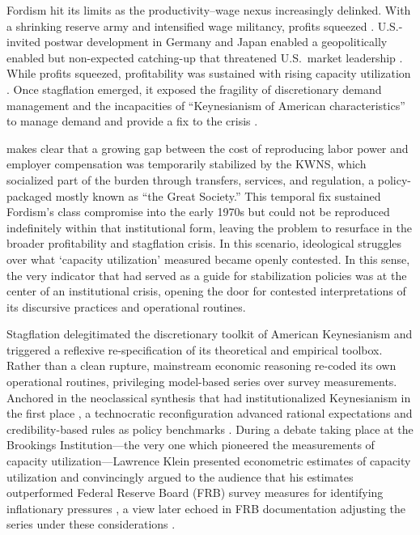 \documentclass[11pt]{article}
\begin{document}
Fordism hit its limits as the productivity--wage nexus increasingly delinked. With a shrinking reserve army and intensified wage militancy, profits squeezed \citep{weisskopf1979}. U.S.-invited postwar development in Germany and Japan enabled a geopolitically enabled but non-expected catching-up that threatened U.S.\ market leadership \citep{lipietz1987,vidal2019geriatric}. While profits squeezed, profitability was sustained with rising capacity utilization \citep{weisskopf1979,shaikh2016}. Once stagflation emerged, it exposed the fragility of discretionary demand management and the incapacities of ``Keynesianism of American characteristics'' to manage demand and provide a fix to the crisis \citep{shaikhetal1999}.

\citet{moos2021} makes clear that a growing gap between the cost of reproducing labor power and employer compensation was temporarily stabilized by the KWNS, which socialized part of the burden through transfers, services, and regulation, a policy-packaged mostly known as ``the Great Society.'' This temporal fix sustained Fordism's class compromise into the early 1970s but could not be reproduced indefinitely within that institutional form, leaving the problem to resurface in the broader profitability and stagflation crisis. In this scenario, ideological struggles over what `capacity utilization' measured became openly contested. In this sense, the very indicator that had served as a guide for stabilization policies was at the center of an institutional crisis, opening the door for contested interpretations of its discursive practices and operational routines.

Stagflation delegitimated the discretionary toolkit of American Keynesianism and triggered a reflexive re-specification of its theoretical and empirical toolbox. Rather than a clean rupture, mainstream economic reasoning re-coded its own operational routines, privileging model-based series over survey measurements. Anchored in the neoclassical synthesis that had institutionalized Keynesianism in the first place \citep{samuelson1947,samuelson1948}, a technocratic reconfiguration advanced rational expectations and credibility-based rules as policy benchmarks \citep{johnson2024}. During a debate taking place at the Brookings Institution---the very one which pioneered the measurements of capacity utilization---Lawrence Klein presented econometric estimates of capacity utilization and convincingly argued to the audience that his estimates outperformed Federal Reserve Board (FRB) survey measures for identifying inflationary pressures \citep{kleinetal1973}, a view later echoed in FRB documentation adjusting the series under these considerations \citep{shaikh2016}.
\end{document}
